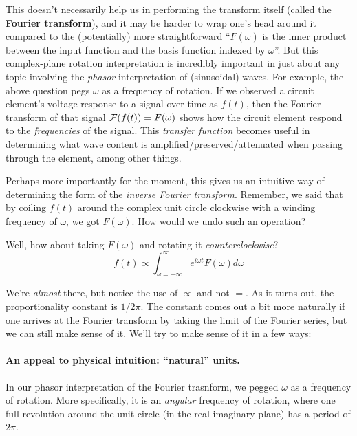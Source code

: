 \documentclass[../main/main.tex]{subfiles}
\begin{document}
This doesn't necessarily help us in performing the transform
itself (called the \textbf{Fourier transform}),
and it may be harder to wrap one's head around it
compared to the (potentially) more straightforward
``\(F(\omega)\) is the inner product between the input function
and the basis function indexed by \(\omega\)''.
But this complex-plane rotation interpretation is
incredibly important in just about any topic involving
the \emph{phasor} interpretation of (sinusoidal) waves. 
For example, the above question
pegs \(\omega\) as a frequency of rotation. If we observed
a circuit element's 
voltage response to a signal over time as \(f(t)\),
then the Fourier transform of that signal 
\(\mathcal{F}(f(t)) = F(\omega)\) shows how the circuit element
respond to the \emph{frequencies} of the signal.
This \emph{transfer function} becomes useful in determining
what wave content is amplified/preserved/attenuated when
passing through the element, among other things.\par

Perhaps more importantly for the moment, this gives us
an intuitive way of determining the form of the 
\emph{inverse Fourier transform}.
Remember, we said that
by coiling \(f(t)\) around the complex unit circle clockwise
with a winding frequency of \(\omega\), we got \(F(\omega)\).
How would we undo such an operation?\par
Well, how about taking \(F(\omega)\) and rotating it
\emph{counterclockwise}?
\[f(t) \propto 
  \int_{\omega=-\infty}^{\infty} e^{i\omega t} F(\omega) d\omega \]

We're \emph{almost} there, but notice the use of \(\propto\)
and not \(=\).
As it turns out, the proportionality constant is \(1/2\pi\).
The constant comes out a bit more naturally if one arrives
at the Fourier transform by taking the limit of
the Fourier series,
but we can still make sense of it.
We'll try to make sense of it in a few ways:

\paragraph{An appeal to physical intuition: ``natural'' units.}

In our phasor interpretation of the Fourier trasnform,
we pegged \(\omega\) as a frequency of rotation.
More specifically, it is an \emph{angular} frequency of rotation,
where one full revolution around the unit circle
(in the real-imaginary plane)
has a period of \(2\pi\).\par
\end{document}
